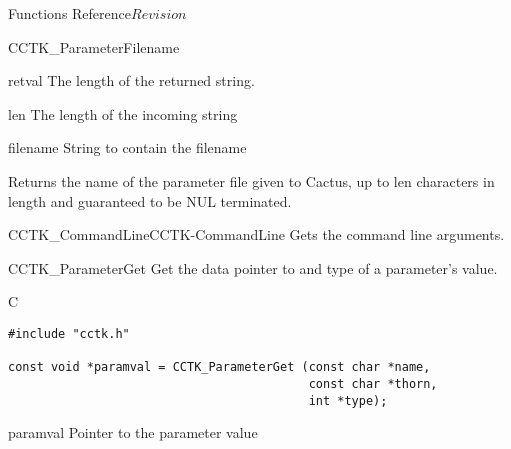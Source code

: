 \begin{cactuspart}{ Functions Reference}{}{$Revision$}
\begin{FunctionDescription}{CCTK\_ParameterFilename}
\begin{ResultSection}
\begin{Result}{retval}
The length of the returned string.
\end{Result}
\end{ResultSection}

\begin{ParameterSection}
\begin{Parameter}{len}
The length of the incoming string
\end{Parameter}
\begin{Parameter}{filename}
String to contain the filename
\end{Parameter}
\end{ParameterSection}

\begin{Discussion}
Returns the name of the parameter file given to Cactus, up to len characters
in length and guaranteed to be NUL terminated.
\end{Discussion}

\begin{SeeAlsoSection}
\begin{SeeAlso2}{CCTK\_CommandLine}{CCTK-CommandLine}
Gets the command line arguments.
\end{SeeAlso2}
\end{SeeAlsoSection}
\end{FunctionDescription}


\begin{FunctionDescription}{CCTK\_ParameterGet}
\label{CCTK-ParameterGet}
Get the data pointer to and type of a parameter's value.

\begin{SynopsisSection}
\begin{Synopsis}{C}
\begin{verbatim}
#include "cctk.h"

const void *paramval = CCTK_ParameterGet (const char *name,
                                          const char *thorn,
                                          int *type);
\end{verbatim}
\end{Synopsis}
\end{SynopsisSection}

\begin{ResultSection}
\begin{Result}{paramval}
Pointer to the parameter value
\end{Result}
\end{ResultSection}


\end{FunctionDescription}
\end{cactuspart}
